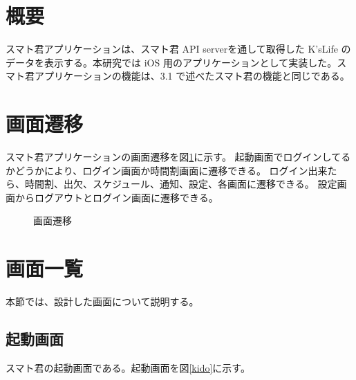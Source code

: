\documentclass[a4j,12pt,onecolumn,oneside,titlepage,openany,final]{jreport}
\begin{document}
\section{概要}\label{rihabiri_jisso}
スマト君アプリケーションは、スマト君 API serverを通して取得した K'sLife のデータを表示する。本研究では iOS 用のアプリケーションとして実装した。スマト君アプリケーションの機能は、3.1 で述べたスマト君の機能と同じである。
\section{画面遷移}\label{rihabiri_jisso}
スマト君アプリケーションの画面遷移を図\ref{seni}に示す。
起動画面でログインしてるかどうかにより、ログイン画面か時間割画面に遷移できる。
ログイン出来たら、時間割、出欠、スケジュール、通知、設定、各画面に遷移できる。
設定画面からログアウトとログイン画面に遷移できる。

\begin{figure}[htbp]
  \centering %
  \caption{画面遷移}\label{seni}
\end{figure}

\section{画面一覧}\label{rihabiri_jisso}
本節では、設計した画面について説明する。
\subsection{起動画面}
スマト君の起動画面である。起動画面を図\ref{kido}に示す。
\end{document}

